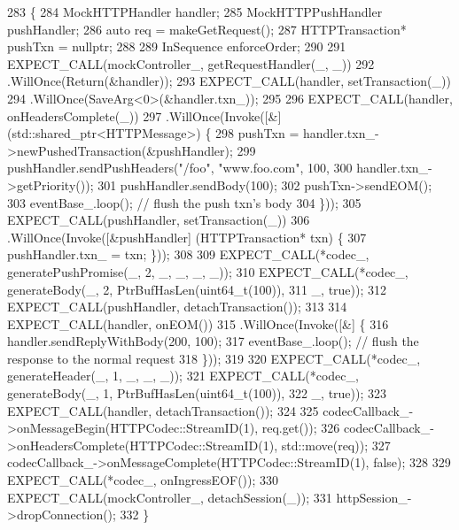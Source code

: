 \begin{DoxyCode}
283                                             \{
284   MockHTTPHandler handler;
285   MockHTTPPushHandler pushHandler;
286   \textcolor{keyword}{auto} req = makeGetRequest();
287   HTTPTransaction* pushTxn = \textcolor{keyword}{nullptr};
288 
289   InSequence enforceOrder;
290 
291   EXPECT\_CALL(mockController\_, getRequestHandler(\_, \_))
292     .WillOnce(Return(&handler));
293   EXPECT\_CALL(handler, setTransaction(\_))
294     .WillOnce(SaveArg<0>(&handler.txn_));
295 
296   EXPECT\_CALL(handler, onHeadersComplete(\_))
297     .WillOnce(Invoke([&] (std::shared\_ptr<HTTPMessage>) \{
298           pushTxn = handler.txn_->newPushedTransaction(&pushHandler);
299           pushHandler.sendPushHeaders(\textcolor{stringliteral}{"/foo"}, \textcolor{stringliteral}{"www.foo.com"}, 100,
300                                       handler.txn_->getPriority());
301           pushHandler.sendBody(100);
302           pushTxn->sendEOM();
303           eventBase\_.loop(); \textcolor{comment}{// flush the push txn's body}
304         \}));
305   EXPECT\_CALL(pushHandler, setTransaction(\_))
306     .WillOnce(Invoke([&pushHandler] (HTTPTransaction* txn) \{
307           pushHandler.txn_ = txn; \}));
308 
309   EXPECT\_CALL(*codec\_, generatePushPromise(\_, 2, \_, \_, \_, \_));
310   EXPECT\_CALL(*codec\_, generateBody(\_, 2, PtrBufHasLen(uint64\_t(100)),
311                                     \_, \textcolor{keyword}{true}));
312   EXPECT\_CALL(pushHandler, detachTransaction());
313 
314   EXPECT\_CALL(handler, onEOM())
315     .WillOnce(Invoke([&] \{
316           handler.sendReplyWithBody(200, 100);
317           eventBase\_.loop(); \textcolor{comment}{// flush the response to the normal request}
318         \}));
319 
320   EXPECT\_CALL(*codec\_, generateHeader(\_, 1, \_, \_, \_));
321   EXPECT\_CALL(*codec\_, generateBody(\_, 1, PtrBufHasLen(uint64\_t(100)),
322                                     \_, \textcolor{keyword}{true}));
323   EXPECT\_CALL(handler, detachTransaction());
324 
325   codecCallback\_->onMessageBegin(HTTPCodec::StreamID(1), req.get());
326   codecCallback\_->onHeadersComplete(HTTPCodec::StreamID(1), std::move(req));
327   codecCallback\_->onMessageComplete(HTTPCodec::StreamID(1), \textcolor{keyword}{false});
328 
329   EXPECT\_CALL(*codec\_, onIngressEOF());
330   EXPECT\_CALL(mockController\_, detachSession(\_));
331   httpSession\_->dropConnection();
332 \}
\end{DoxyCode}
